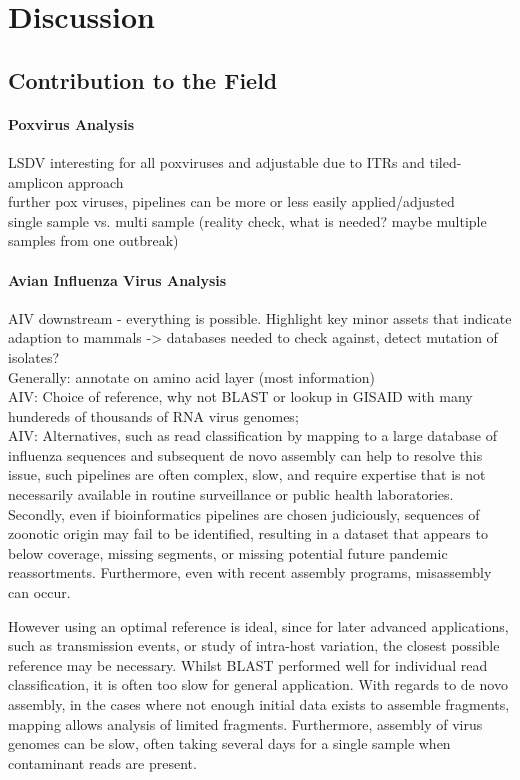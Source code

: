 \chapter{Discussion}\label{chap:discussion}
\todoit

\section{Contribution to the Field}
\todoit

\subsubsection*{Poxvirus Analysis}
\ac{LSDV} interesting for all poxviruses and adjustable due to \acp{ITR} and tiled-amplicon approach \\
further pox viruses, pipelines can be more or less easily applied/adjusted \\
single sample vs. multi sample (reality check, what is needed? maybe multiple samples from one outbreak)


\subsubsection*{Avian Influenza Virus Analysis}
\ac{AIV} downstream - everything is possible. Highlight key minor assets that indicate adaption to mammals -> databases needed to check against, detect mutation of isolates? \\
Generally: annotate on amino acid layer (most information) \\

AIV: Choice of reference, why not BLAST or lookup in GISAID with many hundereds of thousands of RNA virus genomes; \\
AIV: Alternatives, such as read classification by mapping to a large database of influenza sequences and subsequent de novo assembly can help to resolve this issue, such pipelines are often complex, slow, and require expertise that is not necessarily available in routine
surveillance or public health laboratories. Secondly, even if bioinformatics pipelines are chosen judiciously, sequences of zoonotic origin may fail to be identified, resulting in a dataset that appears to below coverage, missing segments, or missing potential future pandemic reassortments. Furthermore, even with recent assembly programs, misassembly can occur.

However using an optimal reference is ideal, since for later advanced applications, such as transmission events, or study of intra-host variation, the closest possible reference may be necessary. Whilst BLAST performed well for individual read classification, it is often too slow for general application. With regards to de novo assembly, in the cases where not enough initial data exists to assemble fragments, mapping allows analysis of limited fragments. Furthermore, assembly of virus genomes can be slow, often taking several days for a single sample when contaminant reads are present.

